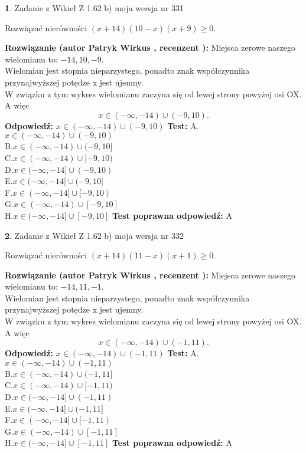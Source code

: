\documentclass[12pt, a4paper]{article}
\theoremstyle{definition} %
\newtheorem{zad}{}
\newcommand{\zadStart}[1]{\begin{zad}#1\newline}
\newcommand{\zadStop}{\end{zad}}
\newcommand{\rozwStart}[2]{\noindent \textbf{Rozwiązanie (autor #1 , recenzent #2): }\newline}
\newcommand{\rozwStop}{\newline}
\newcommand{\odpStart}{\noindent \textbf{Odpowiedź:}\newline}
\newcommand{\odpStop}{\newline}
\newcommand{\testStart}{\noindent \textbf{Test:}\newline}
\newcommand{\testStop}{\newline}
\newcommand{\kluczStart}{\noindent \textbf{Test poprawna odpowiedź:}\newline}
\newcommand{\kluczStop}{\newline}
\begin{document}
\zadStart{Zadanie z Wikieł Z 1.62 b) moja wersja nr 331}

Rozwiązać nierówności $(x+14)(10-x)(x+9)\ge0$.
\zadStop
\rozwStart{Patryk Wirkus}{}
Miejsca zerowe naszego wielomianu to: $-14, 10, -9$.\\
Wielomian jest stopnia nieparzystego, ponadto znak współczynnika przy\linebreak najwyższej potędze x jest ujemny.\\ W związku z tym wykres wielomianu zaczyna się od lewej strony powyżej osi OX. A więc $$x \in (-\infty,-14) \cup (-9,10).$$
\rozwStop
\odpStart
$x \in (-\infty,-14) \cup (-9,10)$
\odpStop
\testStart
A.$x \in (-\infty,-14) \cup (-9,10)$\\
B.$x \in (-\infty,-14) \cup (-9,10]$\\
C.$x \in (-\infty,-14) \cup [-9,10)$\\
D.$x \in (-\infty,-14] \cup (-9,10)$\\
E.$x \in (-\infty,-14] \cup (-9,10]$\\
F.$x \in (-\infty,-14] \cup [-9,10)$\\
G.$x \in (-\infty,-14) \cup [-9,10]$\\
H.$x \in (-\infty,-14] \cup [-9,10]$
\testStop
\kluczStart
A
\kluczStop



\zadStart{Zadanie z Wikieł Z 1.62 b) moja wersja nr 332}

Rozwiązać nierówności $(x+14)(11-x)(x+1)\ge0$.
\zadStop
\rozwStart{Patryk Wirkus}{}
Miejsca zerowe naszego wielomianu to: $-14, 11, -1$.\\
Wielomian jest stopnia nieparzystego, ponadto znak współczynnika przy\linebreak najwyższej potędze x jest ujemny.\\ W związku z tym wykres wielomianu zaczyna się od lewej strony powyżej osi OX. A więc $$x \in (-\infty,-14) \cup (-1,11).$$
\rozwStop
\odpStart
$x \in (-\infty,-14) \cup (-1,11)$
\odpStop
\testStart
A.$x \in (-\infty,-14) \cup (-1,11)$\\
B.$x \in (-\infty,-14) \cup (-1,11]$\\
C.$x \in (-\infty,-14) \cup [-1,11)$\\
D.$x \in (-\infty,-14] \cup (-1,11)$\\
E.$x \in (-\infty,-14] \cup (-1,11]$\\
F.$x \in (-\infty,-14] \cup [-1,11)$\\
G.$x \in (-\infty,-14) \cup [-1,11]$\\
H.$x \in (-\infty,-14] \cup [-1,11]$
\testStop
\kluczStart
A
\kluczStop
\end{document}
